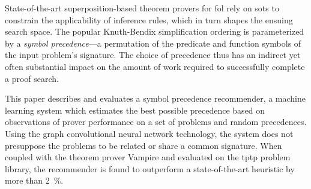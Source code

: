 


State-of-the-art superposition-based theorem provers for \acrlong{fol}
rely on \glspl{sot} to constrain the applicability of inference rules,
which in turn shapes the ensuing search space.
The popular Knuth-Bendix simplification ordering is parameterized by 
a \emph{symbol precedence}---a permutation of the predicate and function symbols
of the input problem's signature.
The choice of precedence thus has an indirect yet often substantial impact
on the amount of work required to successfully complete a proof search.


This paper describes and evaluates a symbol precedence recommender,
a machine learning system which estimates the best possible precedence
based on observations of prover performance on a set of problems and random precedences.
Using the graph convolutional neural network technology,
the system does not presuppose the problems to be related or share a common signature. 
When coupled with the theorem prover Vampire and evaluated on the \acrshort{tptp} problem library,
the recommender is found to outperform a state-of-the-art heuristic by more than \SI{2}{\percent}.

\iffalse
This paper describes and evaluates a symbol precedence recommender based on a \acrlong{gcn}.
When trained on proof attempts that use random symbol precedences,
the recommender outperforms the state of the art heuristic by more than \SI{2}{\percent}.
The symbol precedences predicted by the recommender
specify Knuth-Bendix \glspl{sot}.
These orderings in turn guide the proof search in the state-of-the-art \acrlong{atp} Vampire
by constraining the inferences in the superposition calculus.
\todo{MS: uz i ty ``random symbol precedences'', kterymi to vypraveni nahore zacina potrebuji vampira.
Mozna bude lepsi, trochu nudne, zacit tim, odkud se berou a na co se pouzivaji precedence
a teprve pak rict, ze se z nich ucime a pak umime navrhovat nove, lepsi?}
The recommender is evaluated on \acrlong{fol} problems from the \acrshort{tptp} problem library.
\fi


